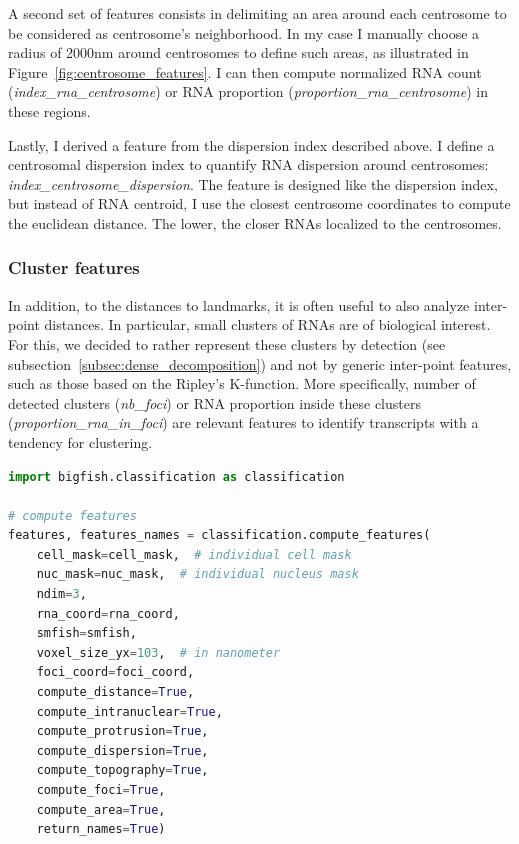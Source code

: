 A second set of features consists in delimiting an area around each centrosome to be considered as centrosome's neighborhood.
In my case I manually choose a radius of 2000nm around centrosomes to define such areas, as illustrated in Figure~\ref{fig:centrosome_features}.
I can then compute normalized \ac{RNA} count (\emph{index\_rna\_centrosome}) or \ac{RNA} proportion (\emph{proportion\_rna\_centrosome}) in these regions.

Lastly, I derived a feature from the dispersion index described above.
I define a centrosomal dispersion index to quantify \ac{RNA} dispersion around centrosomes: \emph{index\_centrosome\_dispersion}. The feature is designed like the 
dispersion index, but instead of \ac{RNA} centroid, I use the closest centrosome coordinates to compute the euclidean distance.
The lower, the closer \ac{RNA}s localized to the centrosomes.

\subsubsection{Cluster features}

In addition, to the distances to landmarks, it is often useful to also analyze inter-point distances. In particular, small clusters of \ac{RNA}s are of biological interest. For this, we decided to rather represent these clusters by detection (see subsection~\ref{subsec:dense_decomposition}) and not by generic inter-point features, such as those based on the Ripley's K-function. 
More specifically, number of detected clusters (\emph{nb\_foci}) or \ac{RNA} proportion inside these clusters (\emph{proportion\_rna\_in\_foci}) are relevant features to identify transcripts with a tendency for clustering.\\


\begin{minipage}{0.9\textwidth}
\begin{lstlisting}[language=Python]
import bigfish.classification as classification

# compute features
features, features_names = classification.compute_features(
    cell_mask=cell_mask,  # individual cell mask
	nuc_mask=nuc_mask,  # individual nucleus mask
	ndim=3,
	rna_coord=rna_coord,
    smfish=smfish,
	voxel_size_yx=103,  # in nanometer
    foci_coord=foci_coord,
    compute_distance=True,
    compute_intranuclear=True,
    compute_protrusion=True,
    compute_dispersion=True,
    compute_topography=True,
    compute_foci=True,
    compute_area=True,
    return_names=True)
\end{lstlisting}
\end{minipage}

